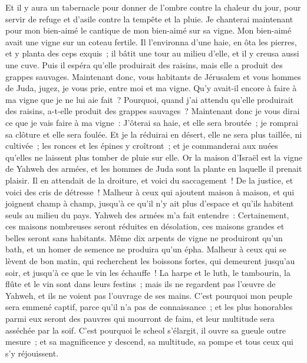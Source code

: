 \begin{multicols}{2}
Et il y aura un tabernacle pour donner de l'ombre contre la chaleur du jour, pour servir de refuge et d'asile contre la tempête et la pluie.
\VerseOne{}Je chanterai maintenant pour mon bien-aimé le cantique de mon bien-aimé sur sa vigne. Mon bien-aimé avait une vigne sur un coteau fertile.
Il l'environna d'une haie, en ôta les pierres, et y planta des ceps exquis~; il bâtit une tour au milieu d'elle, et il y creusa aussi une cuve. Puis il espéra qu'elle produirait des raisins, mais elle a produit des grappes sauvages.
Maintenant donc, vous habitants de Jérusalem et vous hommes de Juda, jugez, je vous prie, entre moi et ma vigne.
Qu'y avait-il encore à faire à ma vigne que je ne lui aie fait~? Pourquoi, quand j'ai attendu qu'elle produirait des raisins, a-t-elle produit des grappes sauvages~?
Maintenant donc je vous dirai ce que je vais faire à ma vigne~: J'ôterai sa haie, et elle sera broutée~; je romprai sa clôture et elle sera foulée.
Et je la réduirai en désert, elle ne sera plus taillée, ni cultivée~; les ronces et les épines y croîtront~; et je commanderai aux nuées qu'elles ne laissent plus tomber de pluie sur elle.
Or la maison d'Israël est la vigne de Yahweh des armées, et les hommes de Juda sont la plante en laquelle il prenait plaisir. Il en attendait de la droiture, et voici du saccagement~! De la justice, et voici des cris de détresse~!
Malheur à ceux qui ajoutent maison à maison, et qui joignent champ à champ, jusqu'à ce qu'il n'y ait plus d'espace et qu'ils habitent seuls au milieu du pays.
Yahweh des armées m'a fait entendre~: Certainement, ces maisons nombreuses seront réduites en désolation, ces maisons grandes et belles seront sans habitants.
Même dix arpents de vigne ne produiront qu'un bath, et un homer de semence ne produira qu'un épha.
Malheur à ceux qui se lèvent de bon matin, qui recherchent les boissons fortes, qui demeurent jusqu'au soir, et jusqu'à ce que le vin les échauffe~!
La harpe et le luth, le tambourin, la flûte et le vin sont dans leurs festins~; mais ils ne regardent pas l'œuvre de Yahweh, et ils ne voient pas l'ouvrage de ses mains.
C'est pourquoi mon peuple sera emmené captif, parce qu'il n'a pas de connaissance~; et les plus honorables parmi eux seront des pauvres qui mourront de faim, et leur multitude sera asséchée par la soif.
C'est pourquoi le scheol s'élargit, il ouvre sa gueule outre mesure~; et sa magnificence y descend, sa multitude, sa pompe et tous ceux qui s'y réjouissent.

\end{multicols}
